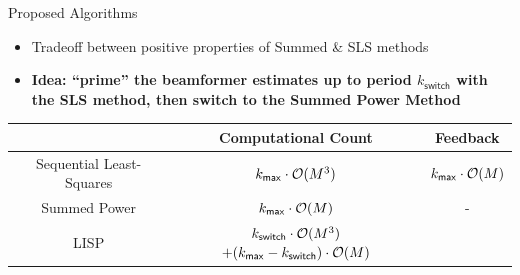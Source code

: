 \documentclass[pdf]{beamer}
\begin{document}
\begin{frame}[t]
\begin{textblock}{0.98}
\begin{tcbraster}[%
    raster columns = 2,
    raster column skip = 0.01\paperwidth,
    raster row skip = 0.01\paperwidth,
    raster equal height=rows
    ]
\begin{mybox}[%
    sidebyside=false,
    left=4pt,
    right=4pt,
    ]{Proposed Algorithms}
    \begin{mysubbox}[%
      squeezed title*=Least-squares initialized Summed Power Method (LISP method),
      sidebyside=false,
      ]{}
      \small
      \addtolength{\leftmargini}{\labelsep}
      \begin{itemize}
      \item Tradeoff between positive properties of Summed \& SLS methods
      \item \textbf{Idea: ``prime'' the beamformer estimates up to period
      $k_{\mathsf{switch}}$ with the SLS method, then switch to the Summed
      Power Method}
      \end{itemize}
    \end{mysubbox}
    \begin{center}
    \footnotesize{%
    \begin{tabular}{|c|c|c|}
    \hline
    & \textsf{\textbf{Computational Count}} & \textsf{\textbf{Feedback}} \\
    \hline
    Sequential Least-Squares & {\color{Red}$k_{\mathsf{max}} \cdot {\cal O}(M^3)$}
                      &  {\color{Red}$k_{\mathsf{max}} \cdot {\cal O}(M)$} \\ \hline
    Summed Power & {\color{LandGrantGreen}$k_{\mathsf{max}} \cdot {\cal O}(M)$}
                      & {\color{LandGrantGreen}-} \\ \hline
                                                                 LISP &
           {\color{Blue} $k_{\mathsf{switch}} \cdot {\cal O}(M^3)$ %
           $+ (k_{\mathsf{max}} - k_{\mathsf{switch}}) \cdot {\cal O}(M)$}


\end{tabular}}
\end{center}
\end{mybox}
\end{tcbraster}
\end{textblock}
\end{frame}
\end{document}
